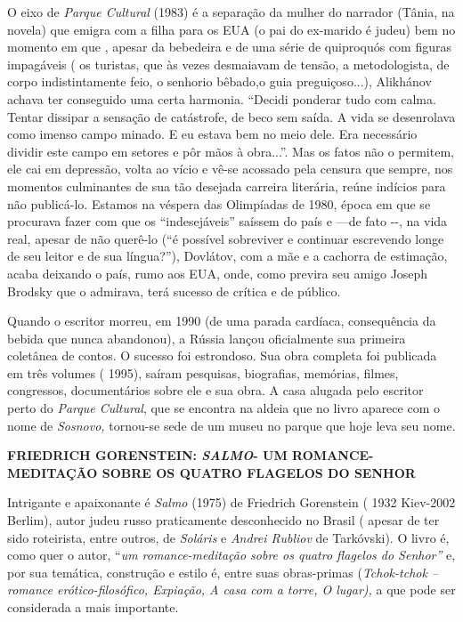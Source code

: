 O eixo de \emph{Parque Cultural} (1983) é a separação da mulher do
narrador (Tânia, na novela) que emigra com a filha para os EUA (o pai do
ex-marido é judeu) bem no momento em que , apesar da bebedeira e de uma
série de quiproquós com figuras impagáveis ( os turistas, que às vezes
desmaiavam de tensão, a metodologista, de corpo indistintamente feio, o
senhorio bêbado,o guia preguiçoso...), Alikhánov achava ter conseguido
uma certa harmonia. ``Decidi ponderar tudo com calma. Tentar dissipar a
sensação de catástrofe, de beco sem saída. A vida se desenrolava como
imenso campo minado. E eu estava bem no meio dele. Era necessário
dividir este campo em setores e pôr mãos à obra...''. Mas os fatos não o
permitem, ele cai em depressão, volta ao vício e vê-se acossado pela
censura que sempre, nos momentos culminantes de sua tão desejada
carreira literária, reúne indícios para não publicá-lo. Estamos na
véspera das Olimpíadas de 1980, época em que se procurava fazer com que
os ``indesejáveis'' saíssem do país e ---de fato -\/-, na vida real,
apesar de não querê-lo (``é possível sobreviver e continuar escrevendo
longe de seu leitor e de sua língua?''), Dovlátov, com a mãe e a
cachorra de estimação, acaba deixando o país, rumo aos EUA, onde, como
previra seu amigo Joseph Brodsky que o admirava, terá sucesso de crítica
e de público.

Quando o escritor morreu, em 1990 (de uma parada cardíaca, consequência
da bebida que nunca abandonou), a Rússia lançou oficialmente sua
primeira coletânea de contos. O sucesso foi estrondoso. Sua obra
completa foi publicada em três volumes ( 1995), saíram pesquisas,
biografias, memórias, filmes, congressos, documentários sobre ele e sua
obra. A casa alugada pelo escritor perto do \emph{Parque Cultural}, que
se encontra na aldeia que no livro aparece com o nome de \emph{Sosnovo,}
tornou-se sede de um museu no parque que hoje leva seu nome.

\textbf{FRIEDRICH GORENSTEIN: \emph{SALMO}- UM ROMANCE-MEDITAÇÃO SOBRE
OS QUATRO FLAGELOS DO SENHOR}

Intrigante e apaixonante é \emph{Salmo} (1975) de Friedrich Gorenstein (
1932 Kiev-2002 Berlim), autor judeu russo praticamente desconhecido no
Brasil ( apesar de ter sido roteirista, entre outros, de \emph{Soláris}
e \emph{Andrei Rubliov} de Tarkóvski). O livro é, como quer o autor,
``\emph{um romance-meditação sobre os quatro flagelos do Senhor''} e,
por sua temática, construção e estilo é, entre suas obras-primas
(\emph{Tchok-tchok -- romance erótico-filosófico, Expiação, A casa com a
torre, O lugar),} a que pode ser considerada a mais importante.

